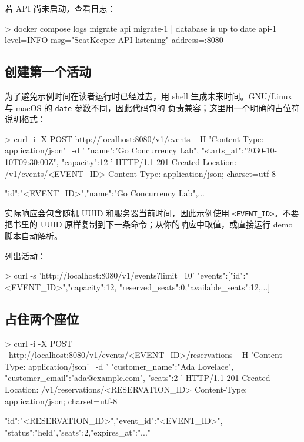 若 API 尚未启动，查看日志：

\begin{shellcode}[]
> docker compose logs migrate api
migrate-1  | database is up to date
api-1      | level=INFO msg="SeatKeeper API listening" address=:8080
\end{shellcode}
\color{PocketInk}

\subsection{创建第一个活动}

为了避免示例时间在读者运行时已经过去，用 shell 生成未来时间。GNU/Linux 与 macOS 的 \texttt{date} 参数不同，因此代码包的  负责兼容；这里用一个明确的占位符说明格式：

\begin{shellcode}[title={创建活动}]
> curl -i -X POST http://localhost:8080/v1/events \
    -H 'Content-Type: application/json' \
    -d '{
      "name":"Go Concurrency Lab",
      "starts_at":"2030-10-10T09:30:00Z",
      "capacity":12
    }'
HTTP/1.1 201 Created
Location: /v1/events/<EVENT_ID>
Content-Type: application/json; charset=utf-8

{"id":"<EVENT_ID>","name":"Go Concurrency Lab",...}
\end{shellcode}
\color{PocketInk}

实际响应会包含随机 UUID 和服务器当前时间，因此示例使用 \texttt{<EVENT\_ID>}。不要把书里的 UUID 原样复制到下一条命令；从你的响应中取值，或直接运行 demo 脚本自动解析。

列出活动：

\begin{shellcode}[]
> curl -s 'http://localhost:8080/v1/events?limit=10'
{"events":[{"id":"<EVENT_ID>","capacity":12,
"reserved_seats":0,"available_seats":12,...}]}
\end{shellcode}
\color{PocketInk}

\subsection{占住两个座位}

\begin{shellcode}[title={创建一笔限时占座}]
> curl -i -X POST \
    http://localhost:8080/v1/events/<EVENT_ID>/reservations \
    -H 'Content-Type: application/json' \
    -d '{
      "customer_name":"Ada Lovelace",
      "customer_email":"ada@example.com",
      "seats":2
    }'
HTTP/1.1 201 Created
Location: /v1/reservations/<RESERVATION_ID>
Content-Type: application/json; charset=utf-8

{"id":"<RESERVATION_ID>","event_id":"<EVENT_ID>",
"status":"held","seats":2,"expires_at":"..."}
\end{shellcode}
\color{PocketInk}

